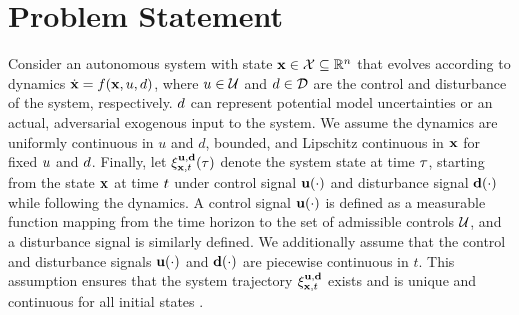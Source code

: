\section{Problem Statement}

Consider an autonomous system with state $\mathbf{x} \in \mathcal{X} \subseteq \mathbb{R}^n$ that evolves according to dynamics $\dot{\mathbf{x}} = f(\mathbf{x}, u, d)$, where $u \in \mathcal{U}$ and $d \in \mathcal{D}$ are the control and disturbance of the system, respectively. 
$d$ can represent potential model uncertainties or an actual, adversarial exogenous input to the system.
We assume the dynamics are uniformly continuous in $u$ and $d$, bounded, and Lipschitz continuous in $\mathbf{x}$ for fixed $u$ and $d$.
Finally, let $\xi_{\mathbf{x},t}^{\mathbf{u},\mathbf{d}}(\tau)$ denote the system state at time $\tau$, starting from the state $\mathbf{x}$ at time $t$ under control signal $\mathbf{u}(\cdot)$ and disturbance signal $\mathbf{d}(\cdot)$ while following the dynamics. A control signal $\mathbf{u}(\cdot)$ is defined as a measurable function mapping from the time horizon to the set of admissible controls $\mathcal{U}$, and a disturbance signal is similarly defined. 
We additionally assume that the control and disturbance signals $\mathbf{u}(\cdot)$ and $\mathbf{d}(\cdot)$ are piecewise continuous in $t$. 
This assumption ensures that the system trajectory $\xi_{\mathbf{x},t}^{\mathbf{u},\mathbf{d}}$
exists and is unique and continuous for all initial states \cite{coddington1955theory, callier2012linear}.

